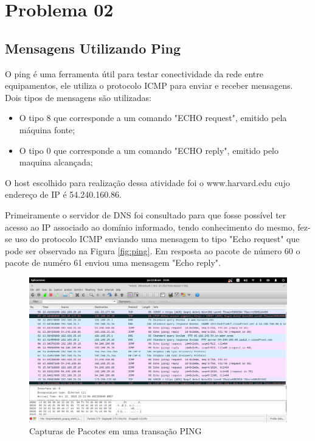 \chapter[Problema 02]{Problema 02}

\section{Mensagens Utilizando Ping}

O ping é uma ferramenta útil para testar conectividade da rede entre equipamentos, ele utiliza o protocolo ICMP para enviar e receber mensagens. Dois tipos de mensagens são utilizadas: 

\begin{itemize}
	\item O tipo 8 que corresponde a um comando "ECHO request", emitido pela máquina fonte; 
	\item O tipo 0 que corresponde a um comando "ECHO reply", emitido pelo maquina alcançada; 
\end{itemize}



O host escolhido para realização dessa atividade foi o www.harvard.edu cujo endereço de IP é 54.240.160.86. 

Primeiramente o servidor de DNS foi consultado para que fosse possível ter acesso ao IP associado ao domínio informado, tendo conhecimento do mesmo, fez-se uso do protocolo ICMP enviando uma mensagem to tipo "Echo request" que pode ser observado na Figura \ref{fig:ping}. Em resposta ao pacote de número 60 o pacote de numéro 61 enviou uma mensagem "Echo reply".


  \begin{figure}[h]
    \centering

    \includegraphics[width=450px, scale=1]{figuras/ping}
    \caption{Capturas de Pacotes em uma transação PING}

 \label{fig:http}
  \end{figure}

